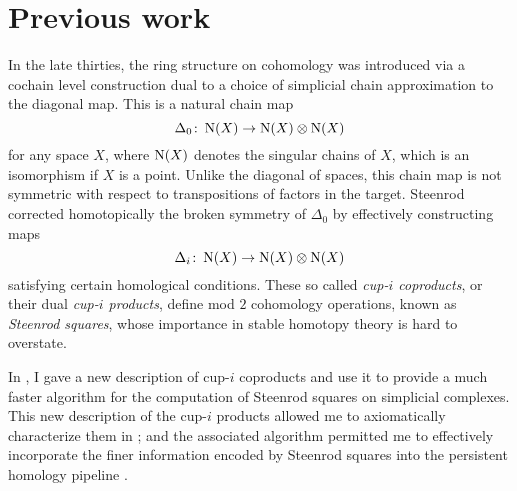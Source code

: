 
\section{Previous work} \label{s:past}

In the late thirties, the ring structure on cohomology was introduced via a cochain level construction dual to a choice of simplicial chain approximation to the diagonal map.
This is a natural chain map
\[
\Delta_0 \colon \operatorname{N}(X) \to \operatorname{N}(X) \otimes \operatorname{N}(X)
\]
for any space $X$, where $\operatorname{N}(X)$ denotes the singular chains of $X$, which is an isomorphism if $X$ is a point.
Unlike the diagonal of spaces, this chain map is not symmetric with respect to transpositions of factors in the target.
Steenrod \cite{steenrod1947products} corrected homotopically the broken symmetry of $\Delta_0$ by effectively constructing maps
\begin{equation*}
\Delta_i \colon \operatorname{N}(X) \to \operatorname{N}(X) \otimes \operatorname{N}(X)
\end{equation*}
satisfying certain homological conditions.
These so called \textit{cup-$i$ coproducts}, or their dual \textit{cup-$i$ products}, define mod $2$ cohomology operations, known as \textit{Steenrod squares}, whose importance in stable homotopy theory is hard to overstate.

In \cite{medina2021newformulas}, I gave a new description of cup-$i$ coproducts and use it to provide a much faster algorithm for the computation of Steenrod squares on simplicial complexes.
This new description of the cup-$i$ products allowed me to axiomatically characterize them in \cite{medina2018axiomatic}; and the associated algorithm permitted me to effectively incorporate the finer information encoded by Steenrod squares into the persistent homology pipeline \cite{medina2018persistence}.

